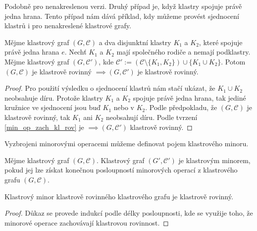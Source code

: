 Podobně pro nenakreslenou verzi. Druhý případ je, když klastry spojuje právě jedna hrana. Tento případ nám dává příklad, kdy můžeme provést sjednocení klastrů i pro nenakreslené klastrové grafy.
\begin{tvr}
Mějme klastrový graf  $(G, \mathcal C)$ a dva disjunktní klastry $K_1$ a $K_2$, které spojuje právě jedna hrana $e$. Nechť $K_1$ a $K_2$ mají společného rodiče a nemají podklastry. Mějme klastrový graf $(G, \mathcal C')$, kde  $\mathcal C'  := (\mathcal C \setminus \{K_1,K_2\}) \cup \{K_1 \cup K_2\}$. Potom $(G, \mathcal C)$ je klastrově rovinný $\implies (G, \mathcal C')$ je klastrově rovinný.
\end{tvr}
\begin{proof}
Pro použití výsledku o sjednocení klastrů nám stačí ukázat, že $K_1 \cup K_2$ neobsahuje díru. Protože klastry $K_1$ a $K_2$ spojuje právě jedna hrana, tak jediné kružnice ve sjednocení jsou buď $K_1$ nebo v $K_2$. Podle předpokladu, že $(G, \mathcal C)$ je klastrově rovinný, tak $K_1$ ani $K_2$ neobsahují díru. Podle tvrzení \ref{min_op_zach_kl_rov} je $\implies (G, \mathcal C')$ klastrově rovinný.
\end{proof}

Vyzbrojeni minorovými operacemi můžeme definovat pojem klastrového minoru.

\begin{defn}
Mějme klastrový graf $(G,\mathcal C)$. Klastrový graf $(G',\mathcal C')$ je klastrovým minorem, pokud jej lze získat konečnou posloupností minorových operací z klastrového grafu $(G,\mathcal C)$.
\end{defn}

\begin{dusl} Klastrový minor klastrově rovinného klastrového grafu je klastrově rovinný.
\label{důsledek}
\end{dusl}
\begin{proof}
Důkaz se provede indukcí podle délky posloupnosti, kde se využije toho, že minorové operace zachovávají klastrovou rovinnost.
\end{proof}